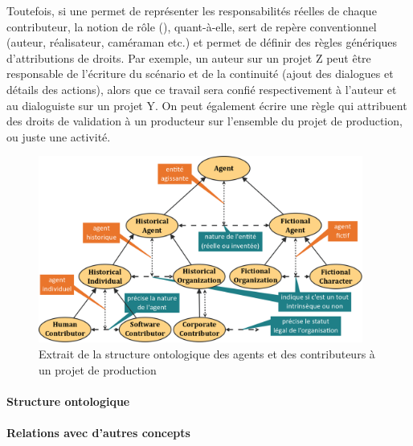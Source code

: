 Toutefois, si une  permet de représenter les responsabilités réelles de chaque contributeur, la notion de rôle (), quant-à-elle, sert de repère conventionnel (auteur, réalisateur, caméraman etc.) et permet de définir des règles génériques d'attributions de droits.
Par exemple, un auteur sur un projet Z peut être responsable de l'écriture du scénario et de la continuité (ajout des dialogues et détails des actions), alors que ce travail sera confié respectivement à l'auteur et au dialoguiste sur un projet Y.
On peut également écrire une règle qui attribuent des droits de validation à un producteur sur l'ensemble du projet de production, ou juste une activité.


\begin{figure}[ht!]
\centering
\includegraphics[width=0.95\textwidth]{./images/SO-Agent-v1.png}
\caption{Extrait de la structure ontologique des agents et des contributeurs à un projet de production}
\label{img:so-agent}
\end{figure}

\paragraph{Structure ontologique}
\paragraph{Relations avec d'autres concepts}

























